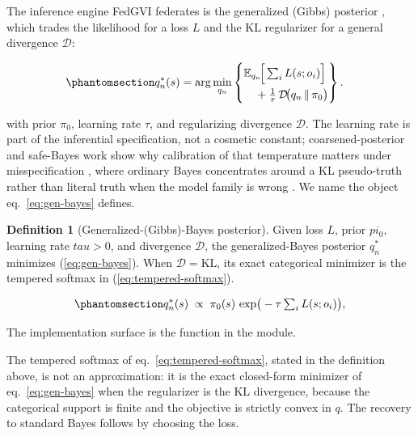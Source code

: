\documentclass[
  english,
]{article}
\theoremstyle{plain}
\theoremstyle{definition}
\newtheorem{definition}[theorem]{Definition}
\theoremstyle{remark}
\theoremstyle{definition}
\begin{document}
The inference engine FedGVI federates is the generalized (Gibbs)
posterior
\citep{bissiri2016general, jiang2008gibbs, jewson2018divergence, knoblauch2022generalized},
which trades the likelihood for a loss \(L\) and the KL regularizer for
a general divergence \(\mathcal D\):

\begin{equation}\protect\phantomsection\label{eq:gen-bayes}{\begin{aligned}
q_n^\ast(s)
&= \arg\min_{q_n}
\left\{
\begin{aligned}
&\mathbb{E}_{q_n}\!\Big[\textstyle\sum_i L(s; o_i)\Big]\\
&\quad + \tfrac{1}{\tau}\,\mathcal D\!\big(q_n \,\|\, \pi_0\big)
\end{aligned}
\right\}.
\end{aligned}}\end{equation}

with prior \(\pi_0\), learning rate \(\tau\), and regularizing
divergence \(\mathcal D\). The learning rate is part of the inferential
specification, not a cosmetic constant; coarsened-posterior and
safe-Bayes work show why calibration of that temperature matters under
misspecification \citep{miller2018coarsening, grunwald2012safe}, where
ordinary Bayes concentrates around a KL pseudo-truth rather than literal
truth when the model family is wrong \citep{kleijn2012misspecification}.
We name the object eq.~\ref{eq:gen-bayes} defines.

\begin{definition}[Generalized-(Gibbs)-Bayes posterior]\label{def:generalized-bayes}
Given loss $L$, prior $pi_0$, learning rate $tau>0$, and divergence
$\mathcal D$, the generalized-Bayes posterior $q_n^\ast$ minimizes
(\ref{eq:gen-bayes}). When $\mathcal D=\mathrm{KL}$, its exact categorical
minimizer is the tempered softmax in (\ref{eq:tempered-softmax}).
\end{definition}

\begin{equation}\protect\phantomsection\label{eq:tempered-softmax}{q_n^\ast(s) \;\propto\; \pi_0(s)\,\exp\!\big(-\tau \textstyle\sum_i L(s; o_i)\big),}\end{equation}

The implementation surface is the 
function in the  module.

The tempered softmax of eq.~\ref{eq:tempered-softmax}, stated in the
definition above, is not an approximation: it is the exact closed-form
minimizer of eq.~\ref{eq:gen-bayes} when the regularizer is the KL
divergence, because the categorical support is finite and the objective
is strictly convex in \(q\). The recovery to standard Bayes follows by
choosing the loss.
\end{document}
